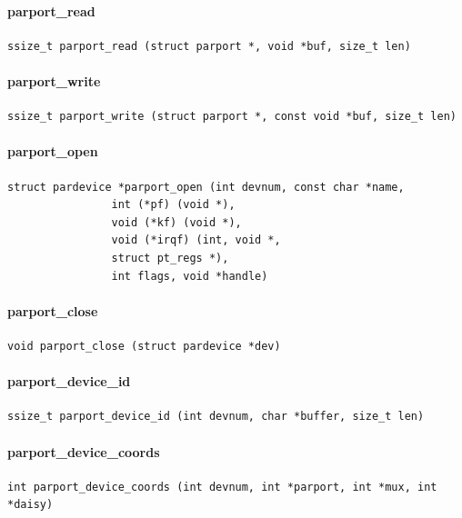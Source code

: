\documentclass[a4paper,11pt]{article}
\begin{document}
\paragraph{parport\_read}
\begin{verbatim}
ssize_t parport_read (struct parport *, void *buf, size_t len)
\end{verbatim}

\paragraph{parport\_write}
\begin{verbatim}
ssize_t parport_write (struct parport *, const void *buf, size_t len)
\end{verbatim}


\paragraph{parport\_open}
\begin{verbatim}
struct pardevice *parport_open (int devnum, const char *name,
				int (*pf) (void *),
				void (*kf) (void *),
				void (*irqf) (int, void *,
				struct pt_regs *),
				int flags, void *handle)
\end{verbatim}


\paragraph{parport\_close}
\begin{verbatim}
void parport_close (struct pardevice *dev)
\end{verbatim}


\paragraph{parport\_device\_id}
\begin{verbatim}
ssize_t parport_device_id (int devnum, char *buffer, size_t len)
\end{verbatim}


\paragraph{parport\_device\_coords}
\begin{verbatim}
int parport_device_coords (int devnum, int *parport, int *mux, int *daisy)
\end{verbatim}
\end{document}
